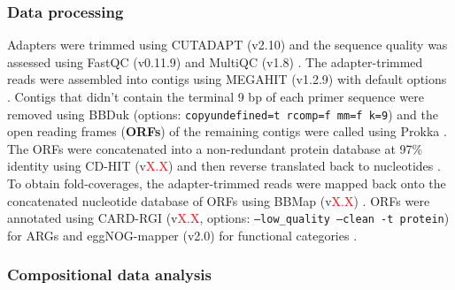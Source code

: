 \subsubsection{Data processing}

Adapters were trimmed using CUTADAPT (v2.10) and the sequence quality was assessed using FastQC (v0.11.9) and MultiQC (v1.8) \parencite{martinCutadaptRemovesAdapter2011, andrewsFastQCQualityControl2010, ewelsMultiQCSummarizeAnalysis2016}.
The adapter-trimmed reads were assembled into contigs using MEGAHIT (v1.2.9) with default options \parencite{liMEGAHITUltrafastSinglenode2015}.
Contigs that didn't contain the terminal 9 bp of each primer sequence were removed using BBDuk (options: \texttt{copyundefined=t rcomp=f mm=f k=9}) and the open reading frames (\textbf{ORFs}) of the remaining contigs were called using Prokka \parencite{bushnellBBMap2020, seemannProkkaRapidProkaryotic2014}.
The ORFs were concatenated into a non-redundant protein database at 97\% identity using CD-HIT (v\textcolor{red}{X.X}) and then reverse translated back to nucleotides \parencite{fuCDHITAcceleratedClustering2012}.
To obtain fold-coverages, the adapter-trimmed reads were mapped back onto the concatenated nucleotide database of ORFs using BBMap (v\textcolor{red}{X.X}) \parencite{bushnellBBMap2020}.
ORFs were annotated using CARD-RGI (v\textcolor{red}{X.X}, options: \texttt{--low\_quality --clean -t protein}) for ARGs and eggNOG-mapper (v2.0) for functional categories \parencite{alcockCARD2020Antibiotic2019, huerta-cepasFastGenomewideFunctional2017, huerta-cepasEggNOGHierarchicalFunctionally2019}.

\subsubsection{Compositional data analysis}
